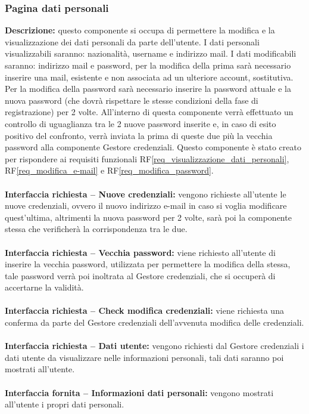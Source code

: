 \subsubsection{Pagina dati personali}
\textbf{Descrizione:} questo componente si occupa di permettere la modifica e la visualizzazione dei dati personali da parte dell’utente. I dati personali visualizzabili saranno: nazionalità, username e indirizzo mail. I dati modificabili saranno: indirizzo mail e password, per la modifica della prima sarà necessario inserire una mail, esistente e non associata ad un ulteriore account, sostitutiva. Per la modifica della password sarà necessario inserire la password attuale e la nuova password (che dovrà rispettare le stesse condizioni della fase di registrazione) per 2 volte. All’interno di questa componente verrà effettuato un controllo di uguaglianza tra le 2 nuove password inserite e, in caso di esito positivo del confronto, verrà inviata la prima di queste due più la vecchia password alla componente Gestore credenziali. Questo componente è stato creato per rispondere ai requisiti funzionali RF\ref{req_visualizzazione_dati_personali}, RF\ref{req_modifica_e-mail} e RF\ref{req_modifica_password}. \\
\\
\textbf{Interfaccia richiesta – Nuove credenziali:} vengono richieste all’utente le nuove credenziali, ovvero il nuovo indirizzo e-mail in caso si voglia modificare quest’ultima, altrimenti la nuova password per 2 volte, sarà poi la componente stessa che verificherà la corrispondenza tra le due. \\
\\
\textbf{Interfaccia richiesta – Vecchia password:} viene richiesto all’utente di inserire la vecchia password, utilizzata per permettere la modifica della stessa, tale password verrà poi inoltrata al Gestore credenziali, che si occuperà di accertarne la validità. \\
\\
\textbf{Interfaccia richiesta – Check modifica credenziali:} viene richiesta una conferma da parte del Gestore credenziali dell’avvenuta modifica delle credenziali. \\
\\
\textbf{Interfaccia richiesta – Dati utente:} vengono richiesti dal Gestore credenziali i dati utente da visualizzare nelle informazioni personali, tali dati saranno poi mostrati all’utente. \\
\\
\textbf{Interfaccia fornita – Informazioni dati personali:} vengono mostrati all’utente i propri dati personali. \\
